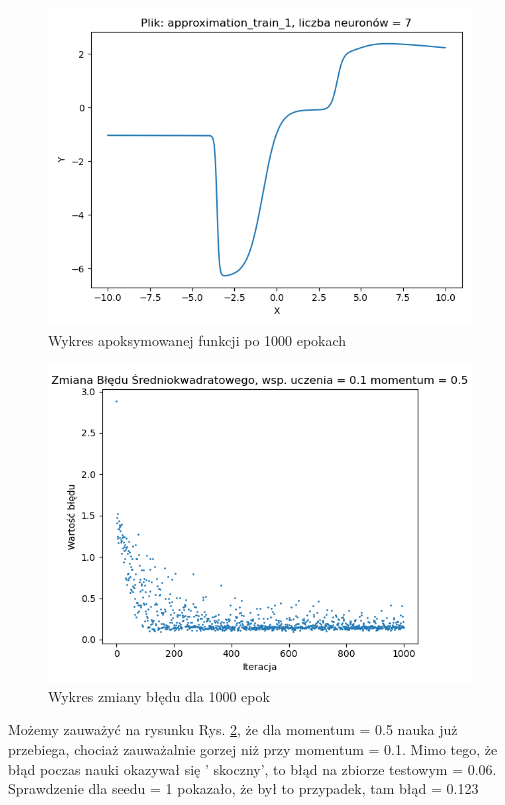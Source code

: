 \documentclass[12pt]{article}
\begin{document}
\begin{figure}[!htb]
 \centering
 \includegraphics[width=12cm]{FunctionPlot7Neuronmomentum05.png}
 \caption{Wykres apoksymowanej funkcji po 1000 epokach}
 \vspace{-0.3cm}
 \label{WykresFun9}
\end{figure}

\begin{figure}[!htb]
 \centering
 \includegraphics[width=12cm]{ZmianaBledu7Neuronmomentum05.png}
 \vspace{-0.3cm}
 \caption{Wykres zmiany błędu dla 1000 epok}
 \label{WykresBlad9}
\end{figure}


\newpage
Możemy zauważyć na rysunku Rys. \ref{WykresBlad9}, że dla momentum = 0.5 nauka już przebiega, chociaż zauważalnie gorzej niż przy momentum = 0.1.
Mimo tego, że błąd poczas nauki okazywał się ' skoczny', to błąd na zbiorze testowym = 0.06. Sprawdzenie dla seedu = 1 pokazało, że był to przypadek, tam błąd = 0.123
\newpage
\end{document}
